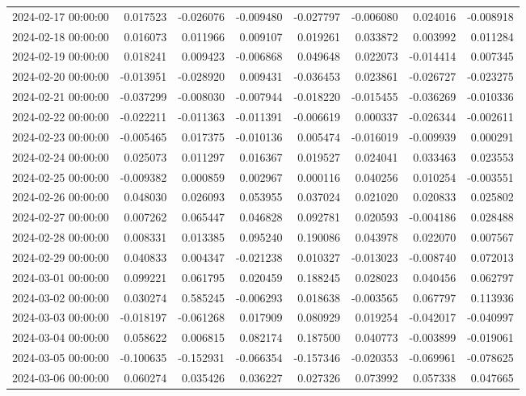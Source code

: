\begin{tabular}{lrrrrrrr}
2024-02-17 00:00:00 & 0.017523 & -0.026076 & -0.009480 & -0.027797 & -0.006080 & 0.024016 & -0.008918 \\
2024-02-18 00:00:00 & 0.016073 & 0.011966 & 0.009107 & 0.019261 & 0.033872 & 0.003992 & 0.011284 \\
2024-02-19 00:00:00 & 0.018241 & 0.009423 & -0.006868 & 0.049648 & 0.022073 & -0.014414 & 0.007345 \\
2024-02-20 00:00:00 & -0.013951 & -0.028920 & 0.009431 & -0.036453 & 0.023861 & -0.026727 & -0.023275 \\
2024-02-21 00:00:00 & -0.037299 & -0.008030 & -0.007944 & -0.018220 & -0.015455 & -0.036269 & -0.010336 \\
2024-02-22 00:00:00 & -0.022211 & -0.011363 & -0.011391 & -0.006619 & 0.000337 & -0.026344 & -0.002611 \\
2024-02-23 00:00:00 & -0.005465 & 0.017375 & -0.010136 & 0.005474 & -0.016019 & -0.009939 & 0.000291 \\
2024-02-24 00:00:00 & 0.025073 & 0.011297 & 0.016367 & 0.019527 & 0.024041 & 0.033463 & 0.023553 \\
2024-02-25 00:00:00 & -0.009382 & 0.000859 & 0.002967 & 0.000116 & 0.040256 & 0.010254 & -0.003551 \\
2024-02-26 00:00:00 & 0.048030 & 0.026093 & 0.053955 & 0.037024 & 0.021020 & 0.020833 & 0.025802 \\
2024-02-27 00:00:00 & 0.007262 & 0.065447 & 0.046828 & 0.092781 & 0.020593 & -0.004186 & 0.028488 \\
2024-02-28 00:00:00 & 0.008331 & 0.013385 & 0.095240 & 0.190086 & 0.043978 & 0.022070 & 0.007567 \\
2024-02-29 00:00:00 & 0.040833 & 0.004347 & -0.021238 & 0.010327 & -0.013023 & -0.008740 & 0.072013 \\
2024-03-01 00:00:00 & 0.099221 & 0.061795 & 0.020459 & 0.188245 & 0.028023 & 0.040456 & 0.062797 \\
2024-03-02 00:00:00 & 0.030274 & 0.585245 & -0.006293 & 0.018638 & -0.003565 & 0.067797 & 0.113936 \\
2024-03-03 00:00:00 & -0.018197 & -0.061268 & 0.017909 & 0.080929 & 0.019254 & -0.042017 & -0.040997 \\
2024-03-04 00:00:00 & 0.058622 & 0.006815 & 0.082174 & 0.187500 & 0.040773 & -0.003899 & -0.019061 \\
2024-03-05 00:00:00 & -0.100635 & -0.152931 & -0.066354 & -0.157346 & -0.020353 & -0.069961 & -0.078625 \\
2024-03-06 00:00:00 & 0.060274 & 0.035426 & 0.036227 & 0.027326 & 0.073992 & 0.057338 & 0.047665 \\

\end{tabular}
